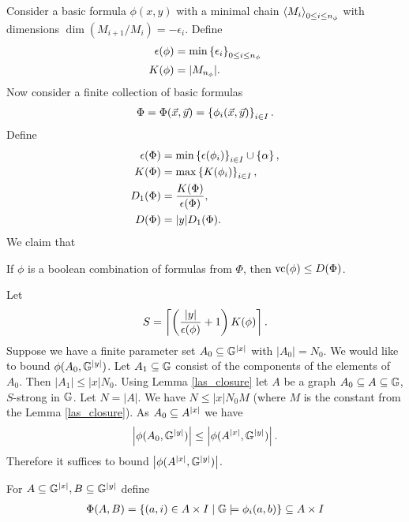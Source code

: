 Consider a basic formula $\phi(x,y)$ with a minimal chain  $\left\langle M_i \right\rangle_{0 \leq i \leq n_{\phi}}$ with dimensions  $\dim(M_{i+1}/M_i) = -\epsilon_i$.
Define
\begin{align*}
  \epsilon(\phi) &= \min \left\{\epsilon_i\right\}_{0 \leq i \leq n_\phi}\\
  K(\phi) &= |M_{n_\phi}|.
\end{align*}
Now consider a finite collection of basic formulas
\begin{align*}
  \Phi = \Phi(\vec x, \vec y) = \left\{\phi_i(\vec x, \vec y)\right\}_{i\in I}.
\end{align*}
Define
\begin{align*}
  \epsilon(\Phi) &= \min \left\{\epsilon(\phi_i)\right\}_{i \in I} \cup \left\{\alpha\right\}, \\
  K(\Phi) &= \max \left\{K(\phi_i)\right\}_{i \in I},\\
  D_1(\Phi) &= \frac{K(\Phi)}{\epsilon(\Phi)}, \\
  D(\Phi) &= |y| D_1(\Phi).\\
\end{align*}
We claim that
\begin{Theorem} \label{upper}
  If $\phi$ is a boolean combination of formulas from $\Phi$, then $\operatorname{vc}(\phi) \leq D(\Phi)$.
\end{Theorem}
Let
\begin{align*}
  S = \left\lceil{\left(\frac{|y|}{\epsilon(\phi)} + 1\right) K(\phi)}\right\rceil.
\end{align*}
Suppose we have a finite parameter set $A_0 \subseteq \mathbb G^{|x|}$ with $|A_0| = N_0$.
We would like to bound $\phi(A_0, \mathbb G^{|y|})$.
Let $A_1 \subseteq \mathbb G$ consist of the components of the elements of $A_0$.
Then $|A_1| \leq |x| N_0$.
Using Lemma \ref{las_closure} let $A$ be a graph $A_0 \subseteq A \subseteq \mathbb G$, $S$-strong in $\mathbb G$.
Let $N = |A|$.
We have $N \leq |x| N_0 M$ (where $M$ is the constant from the Lemma \ref{las_closure}).
As $A_0 \subseteq A^{|x|}$ we have
\begin{align*}
  \left|\phi(A_0, \mathbb G^{|y|})\right| \leq \left|\phi(A^{|x|}, \mathbb G^{|y|})\right|.
\end{align*}
Therefore it suffices to bound $\left|\phi(A^{|x|}, \mathbb G^{|y|})\right|$.

\begin{Definition}
  For $A \subseteq \mathbb G^{|x|}, B \subseteq \mathbb G^{|y|}$ define
  \begin{align*}
    \Phi(A, B) = \left\{(a, i) \in A \times I \mid \mathbb G \models \phi_i(a, b)\right\} \subseteq A \times I
  \end{align*}  
\end{Definition}


